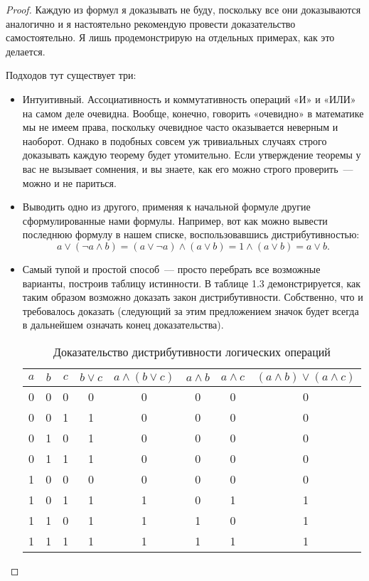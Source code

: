 \begin{proof}
Каждую из формул я доказывать не буду, поскольку все они доказываются аналогично и я настоятельно рекомендую провести доказательство самостоятельно. Я лишь продемонстрирую на отдельных примерах, как это делается.

Подходов тут существует три:
\begin{itemize}
\item Интуитивный. Ассоциативность и коммутативность операций «И» и «ИЛИ» на самом деле очевидна. Вообще, конечно, говорить «очевидно» в математике мы не имеем права, поскольку очевидное часто оказывается неверным и наоборот. Однако в подобных совсем уж тривиальных случаях строго доказывать каждую теорему будет утомительно. Если утверждение теоремы у вас не вызывает сомнения, и вы знаете, как его можно строго проверить~--- можно и не париться.
\item Выводить одно из другого, применяя к начальной формуле другие сформулированные нами формулы. Например, вот как можно вывести последнюю формулу в нашем списке, воспользовавшись дистрибутивностью:
$$
a \lor (\neg a \land b) = (a \lor \neg a) \land (a \lor b) = 1 \land (a \lor b) = a \lor b.
$$

\item Самый тупой и простой способ~--- просто перебрать все возможные варианты, построив таблицу истинности. В таблице 1.3 демонстрируется, как таким образом возможно доказать закон дистрибутивности. Собственно, что и требовалось доказать (следующий за этим предложением значок будет всегда в дальнейшем означать конец доказательства).

\begin{table}[h]
\centering
\begin{tabular}{ccc|cc|ccc}
$a$&$b$&$c$&$b\lor c$&$a\land(b\lor c)$&$a\land b$&$a\land c$&$(a\land b)\lor(a\land c)$\\
\hline
0&0&0&0&0&0&0&0\\
0&0&1&1&0&0&0&0\\
0&1&0&1&0&0&0&0\\
0&1&1&1&0&0&0&0\\
1&0&0&0&0&0&0&0\\
1&0&1&1&1&0&1&1\\
1&1&0&1&1&1&0&1\\
1&1&1&1&1&1&1&1
\end{tabular}
\caption{Доказательство дистрибутивности логических операций}
\end{table}

\end{itemize}
\end{proof}

